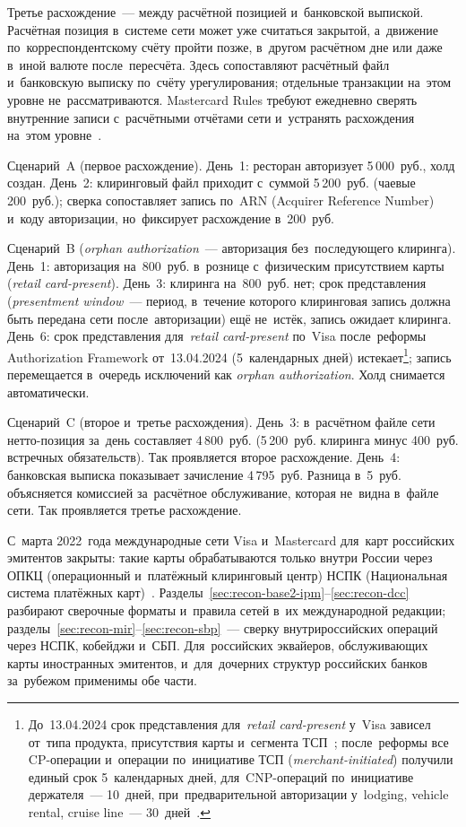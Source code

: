 Третье расхождение~--- между расчётной позицией и~банковской выпиской.
Расчётная позиция в~системе сети может уже считаться закрытой, а~движение
по~корреспондентскому счёту пройти позже, в~другом расчётном дне или даже
в~иной валюте после~пересчёта. Здесь сопоставляют расчётный файл
и~банковскую выписку по~счёту урегулирования; отдельные транзакции на~этом
уровне не~рассматриваются. Mastercard Rules требуют ежедневно сверять
внутренние записи с~расчётными отчётами сети и~устранять расхождения
на~этом уровне~\cite{mc-rules}.

Сценарий~A (первое расхождение). День~1: ресторан авторизует 5\,000~руб., холд создан.
День~2: клиринговый файл приходит с~суммой 5\,200~руб. (чаевые 200~руб.); сверка
сопоставляет запись по~ARN (Acquirer Reference Number) и~коду авторизации,
но~фиксирует расхождение в~200~руб.

Сценарий~B (\textit{orphan authorization}~--- авторизация без~последующего
клиринга). День~1: авторизация на~800~руб. в~рознице с~физическим присутствием карты (\textit{retail card-present}).
День~3: клиринга на~800~руб. нет; срок представления
(\textit{presentment window}~--- период, в~течение которого клиринговая запись
должна быть передана сети после~авторизации) ещё не~истёк, запись ожидает
клиринга. День~6: срок представления для~\textit{retail card-present} по~Visa
после~реформы Authorization Framework от~13.04.2024 (5~календарных дней)
истекает\footnote{До~13.04.2024 срок представления для~\textit{retail card-present} у~Visa
  зависел от~типа продукта, присутствия карты и~сегмента ТСП~\cite{visa-auth-framework-2024};
  после~реформы все
  CP-операции и~операции по~инициативе ТСП (\textit{merchant-initiated}) получили
  единый срок 5~календарных дней, для~CNP-операций по~инициативе держателя~--- 10~дней,
при~предварительной авторизации у~lodging, vehicle rental, cruise line~--- 30~дней~\cite{visa-core-rules}.}; запись перемещается
в~очередь исключений как \textit{orphan authorization}. Холд снимается
автоматически.

Сценарий~C (второе и~третье расхождения). День~3: в~расчётном файле сети
нетто-позиция за~день составляет 4\,800~руб. (5\,200~руб. клиринга минус
400~руб. встречных обязательств). Так проявляется второе расхождение. День~4:
банковская выписка показывает зачисление 4\,795~руб. Разница в~5~руб.
объясняется комиссией за~расчётное обслуживание, которая не~видна в~файле сети.
Так проявляется третье расхождение.

С~марта 2022~года международные сети Visa и~Mastercard для~карт российских
эмитентов закрыты: такие карты обрабатываются только внутри России через
ОПКЦ (операционный и~платёжный клиринговый центр) НСПК (Национальная система
платёжных карт)~\cite{cbr-ps,nspk-mir-rules}.
Разделы~\ref{sec:recon-base2-ipm}--\ref{sec:recon-dcc} разбирают сверочные
форматы и~правила сетей в~их международной редакции;
разделы~\ref{sec:recon-mir}--\ref{sec:recon-sbp}~--- сверку внутрироссийских
операций через НСПК, кобейджи и~СБП. Для~российских эквайеров, обслуживающих
карты иностранных эмитентов, и~для~дочерних структур российских банков
за~рубежом применимы обе части.

